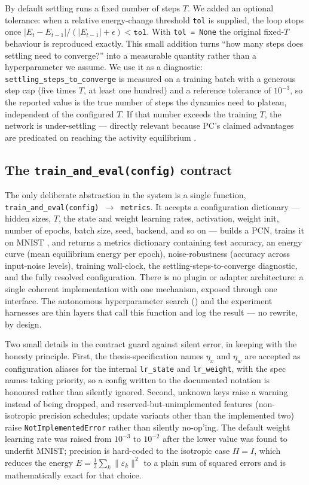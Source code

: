 By default settling runs a fixed number of steps $T$. We added an optional tolerance: when a relative
energy-change threshold \texttt{tol} is supplied, the loop stops once
$|E_t - E_{t-1}| / (|E_{t-1}| + \epsilon) < \texttt{tol}$. With \texttt{tol = None} the original
fixed-$T$ behaviour is reproduced exactly. This small addition turns ``how many steps does settling
need to converge?'' into a measurable quantity rather than a hyperparameter we assume. We use it as a
diagnostic: \texttt{settling\_steps\_to\_converge} is measured on a training batch with a generous step
cap (five times $T$, at least one hundred) and a reference tolerance of $10^{-3}$, so the reported value
is the true number of steps the dynamics need to plateau, independent of the configured $T$. If that
number exceeds the training $T$, the network is under-settling --- directly relevant because PC's
claimed advantages are predicated on reaching the activity equilibrium \citep{song2024prospective,
innocenti2026limits, qi2025settling}.

\subsection{The \texttt{train\_and\_eval(config)} contract}

The only deliberate abstraction in the system is a single function, \texttt{train\_and\_eval(config)
$\rightarrow$ metrics}. It accepts a configuration dictionary --- hidden sizes, $T$, the state and
weight learning rates, activation, weight init, number of epochs, batch size, seed, backend, and so on
--- builds a PCN, trains it on MNIST \citep{lecun1998mnist}, and returns a metrics dictionary
containing test accuracy, an energy curve (mean equilibrium energy per epoch), noise-robustness
(accuracy across input-noise levels), training wall-clock, the settling-steps-to-converge diagnostic,
and the fully resolved configuration. There is no plugin or adapter architecture: a single coherent
implementation with one mechanism, exposed through one interface. The autonomous hyperparameter search
() and the experiment harnesses are thin layers that call this function and log
the result --- no rewrite, by design.

Two small details in the contract guard against silent error, in keeping with the honesty principle.
First, the thesis-specification names $\eta_x$ and $\eta_w$ are accepted as configuration aliases for
the internal \texttt{lr\_state} and \texttt{lr\_weight}, with the spec names taking priority, so a config
written to the documented notation is honoured rather than silently ignored. Second, unknown keys raise
a warning instead of being dropped, and reserved-but-unimplemented features (non-isotropic precision
schedules; update variants other than the implemented two) raise \texttt{NotImplementedError} rather
than silently no-op'ing. The default weight learning rate was raised from $10^{-3}$ to $10^{-2}$ after
the lower value was found to underfit MNIST; precision is hard-coded to the isotropic case $\Pi = I$,
which reduces the energy $E = \tfrac12\sum_k \lVert\varepsilon_k\rVert^2$ to a plain sum of squared
errors and is mathematically exact for that choice.

